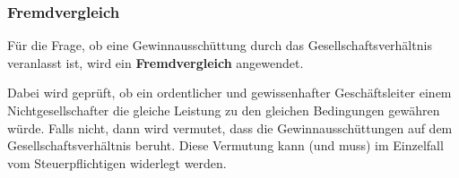 \documentclass[12pt,A4]{extarticle}
\newcommand{\highlight}[1]{\textcolor{highlightColor}{\textbf{#1}}}
\begin{document}
\subsubsection{Fremdvergleich}
Für die Frage, ob eine Gewinnausschüttung durch das Gesellschaftsverhältnis veranlasst ist, wird ein \highlight{Fremdvergleich} angewendet.\par
Dabei wird geprüft, ob ein ordentlicher und gewissenhafter Geschäftsleiter einem Nichtgesellschafter die gleiche Leistung zu den gleichen Bedingungen gewähren würde. Falls nicht, dann wird vermutet, dass die Gewinnausschüttungen auf dem Gesellschaftsverhältnis beruht. Diese Vermutung kann (und muss) im Einzelfall vom Steuerpflichtigen widerlegt werden.
\end{document}
